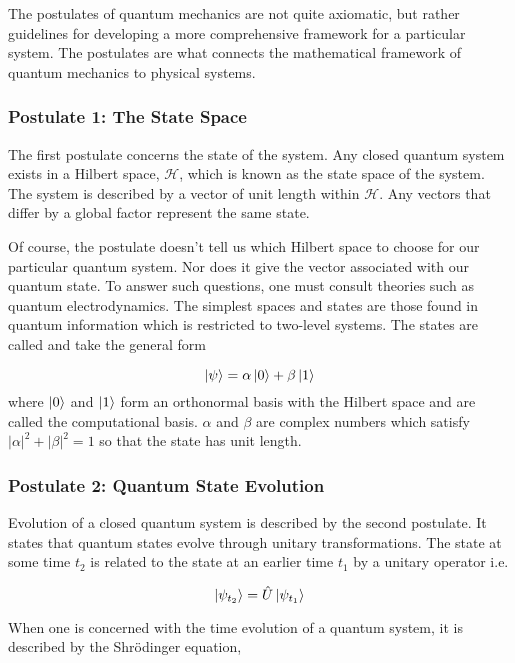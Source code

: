 The postulates of quantum mechanics are not quite axiomatic, but rather guidelines for developing a more comprehensive framework for a particular system. The postulates are what connects the mathematical framework of quantum mechanics to physical systems.

\subsubsection*{Postulate 1: The State Space}

The first postulate concerns the state of the system. Any closed quantum system exists in a Hilbert space, $\mathcal{H}$, which is known as the state space of the system. The system is described by a vector of unit length within $\mathcal{H}$. Any vectors that differ by a global factor represent the same state.

Of course, the postulate doesn't tell us which Hilbert space to choose for our particular quantum system. Nor does it give the vector associated with our quantum state. To answer such questions, one must consult theories such as quantum electrodynamics. The simplest spaces and states are those found in quantum information which is restricted to two-level systems. The states are called  and take the general form

\begin{equation}
	\ket{\psi} = \alpha\ket{0} + \beta\ket{1}
\end{equation} 
where $\ket{0}$ and $\ket{1}$ form an orthonormal basis with the Hilbert space and are called the computational basis. $\alpha$ and $\beta$ are complex numbers which satisfy $|\alpha|^2 + |\beta|^2 = 1$ so that the state has unit length.

\subsubsection*{Postulate 2: Quantum State Evolution}

Evolution of a closed quantum system is described by the second postulate. It states that quantum states evolve through unitary transformations. The state at some time $t_2$ is related to the state at an earlier time $t_1$ by a unitary operator i.e.

\begin{equation}
	\ket{\psi_{t_2}} = \hat{U}\ket{\psi_{t_1}}
\end{equation}

When one is concerned with the time evolution of a quantum system, it is described by the Shr\"{o}dinger equation,

